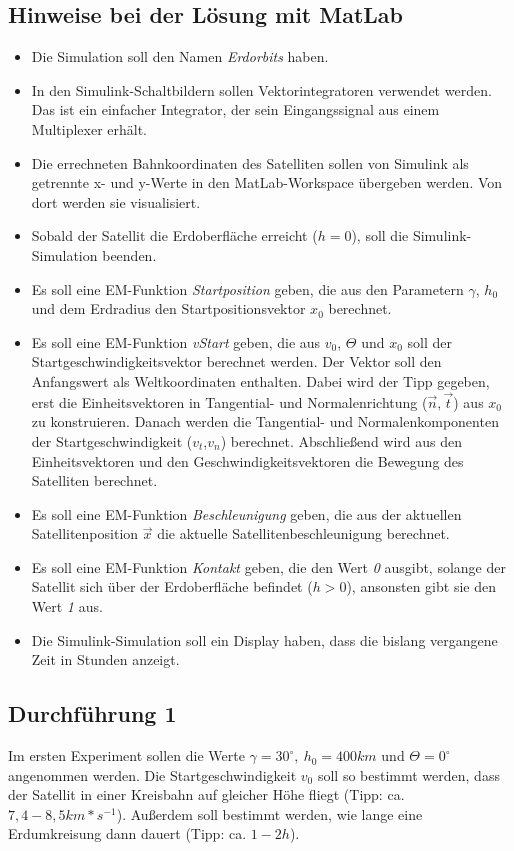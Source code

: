 \documentclass[]{scrartcl}
\begin{document}
\subsection{Hinweise bei der Lösung mit MatLab}
\begin{itemize}
\item Die Simulation soll den Namen \textit{Erdorbits} haben.
\item In den Simulink-Schaltbildern sollen Vektorintegratoren verwendet werden. Das ist ein einfacher Integrator, der sein Eingangssignal aus einem Multiplexer erhält.
\item Die errechneten Bahnkoordinaten des Satelliten sollen von Simulink als getrennte x- und y-Werte in den MatLab-Workspace übergeben werden. Von dort werden sie visualisiert.
\item Sobald der Satellit die Erdoberfläche erreicht ($h=0$), soll die Simulink-Simulation beenden.
\item Es soll eine EM-Funktion \textit{Startposition} geben, die aus den Parametern $\gamma$, $h_{0}$ und dem Erdradius den Startpositionsvektor $x_{0}$ berechnet.
\item Es soll eine EM-Funktion \textit{vStart} geben, die aus $v_{0}$, $\Theta$ und $x_{0}$ soll der Startgeschwindigkeitsvektor berechnet werden. Der Vektor soll den Anfangswert als Weltkoordinaten enthalten. Dabei wird der Tipp gegeben, erst die Einheitsvektoren in Tangential- und Normalenrichtung ($\vec{n},\vec{t}$) aus $x_{0}$ zu konstruieren. Danach werden die Tangential- und Normalenkomponenten der Startgeschwindigkeit ($v_{t}$,$v_{n}$) berechnet. Abschließend wird aus den Einheitsvektoren und den Geschwindigkeitsvektoren die Bewegung des Satelliten berechnet.
\item Es soll eine EM-Funktion \textit{Beschleunigung} geben, die aus der aktuellen Satellitenposition $\vec{x}$ die aktuelle Satellitenbeschleunigung berechnet.
\item Es soll eine EM-Funktion \textit{Kontakt} geben, die den Wert \textit{0} ausgibt, solange der Satellit sich über der Erdoberfläche befindet ($h > 0$), ansonsten gibt sie den Wert \textit{1} aus.
\item Die Simulink-Simulation soll ein Display haben, dass die bislang vergangene Zeit in Stunden anzeigt.
\end{itemize}

\subsection{Durchführung 1}
Im ersten Experiment sollen die Werte $\gamma = 30^\circ,\ h_{0} = 400km$ und $\Theta=0^\circ$ angenommen werden. Die Startgeschwindigkeit $v_{0}$ soll so bestimmt werden, dass der Satellit in einer Kreisbahn auf gleicher Höhe fliegt (Tipp: ca. $7,4 - 8,5 km*s^{-1}$). Außerdem soll bestimmt werden, wie lange eine Erdumkreisung dann dauert (Tipp: ca. $1 - 2h$).
\end{document}
